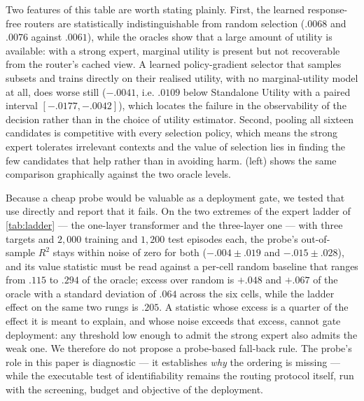 Two features of this table are worth stating plainly. First, the learned
response-free routers are statistically indistinguishable from random
selection ($.0068$ and $.0076$ against $.0061$), while the oracles show that a
large amount of utility is available: with a strong expert, marginal utility is
present but not recoverable from the router's cached view. A learned
policy-gradient selector that samples subsets and trains directly on their
realised utility, with no marginal-utility model at all, does worse still
($-.0041$, i.e. $.0109$ below Standalone Utility with a paired interval
$[-.0177,-.0042]$), which locates the failure in the observability of the
decision rather than in the choice of utility estimator. Second, pooling all
sixteen candidates is competitive with every selection policy, which means the
strong expert tolerates irrelevant contexts and the value of selection lies in
finding the few candidates that help rather than in avoiding harm.
 (left) shows the same comparison graphically against the
two oracle levels.


Because a cheap probe would be valuable as a deployment gate, we tested that
use directly and report that it fails. On the two extremes of the expert ladder
of \cref{tab:ladder} --- the one-layer transformer and the three-layer one ---
with three targets and $2{,}000$ training and $1{,}200$ test episodes each, the
probe's out-of-sample $R^2$ stays within noise of zero for both ($-.004 \pm
.019$ and $-.015 \pm .028$), and its value statistic must be read against a
per-cell random baseline that ranges from $.115$ to $.294$ of the oracle;
excess over random is $+.048$ and $+.067$ of the oracle with a standard
deviation of $.064$ across the six cells, while the ladder effect on the same
two rungs is $.205$. A statistic
whose excess is a quarter of the effect it is meant to explain, and whose noise
exceeds that excess, cannot gate deployment: any threshold low enough to admit
the strong expert also admits the weak one. We therefore do not propose a
probe-based fall-back rule. The probe's role in this paper is diagnostic --- it
establishes \emph{why} the ordering is missing --- while the executable test of
identifiability remains the routing protocol itself, run with the screening,
budget and objective of the deployment.


